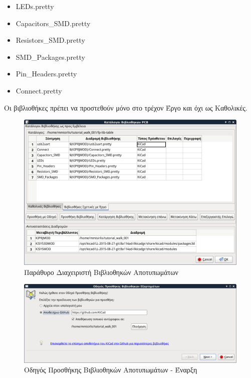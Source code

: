 \documentclass[a4paper]{article}
\begin{document}
\begin{itemize}
    \item LEDs.pretty
    \item Capacitors\_SMD.pretty
    \item Resistors\_SMD.pretty
    \item SMD\_Packages.pretty
    \item Pin\_Headers.pretty
    \item Connect.pretty
\end{itemize}

Οι βιβλιοθήκες πρέπει να προστεθούν μόνο στο τρέχον Έργο και όχι ως Καθολικές.

\begin{figure}
  \begin{center}
    \includegraphics[width=.9\textwidth]{img/pcb-dial-libs.png}
    \caption{Παράθυρο Διαχειριστή Βιβλιοθηκών Αποτυπωμάτων}
    \label{fig:pcb-dial-libs}
  \end{center}
\end{figure}

\begin{figure}
  \begin{center}
    \includegraphics[width=.9\textwidth]{img/pcb-dial-libwiz.png}
    \caption{Οδηγός Προσθήκης Βιβλιοθηκών Αποτυπωμάτων - Έναρξη}
    \label{fig:pcb-dial-libwiz}
  \end{center}
\end{figure}
\end{document}
